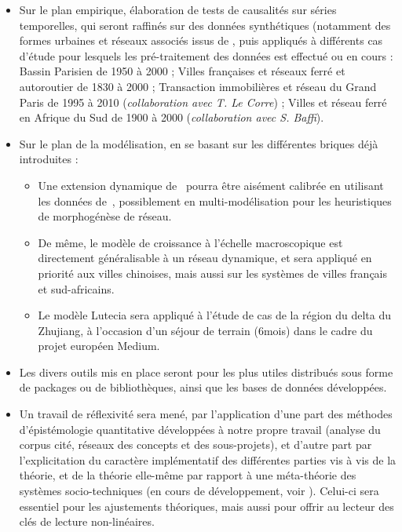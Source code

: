 \begin{itemize}
\item Sur le plan empirique, élaboration de tests de causalités sur séries temporelles, qui seront raffinés sur des données synthétiques (notamment des formes urbaines et réseaux associés issus de \cite{raimbault2014hybrid}, puis appliqués à différents cas d'étude pour lesquels les pré-traitement des données est effectué ou en cours : Bassin Parisien de 1950 à 2000 ; Villes françaises et réseaux ferré et autoroutier de 1830 à 2000 ; Transaction immobilières et réseau du Grand Paris de 1995 à 2010 (\textit{collaboration avec T. Le Corre}) ; Villes et réseau ferré en Afrique du Sud de 1900 à 2000 (\textit{collaboration avec S. Baffi}).
\item Sur le plan de la modélisation, en se basant sur les différentes briques déjà introduites :
\begin{itemize}
\item Une extension dynamique de~\cite{raimbault2016generation} pourra être aisément calibrée en utilisant les données de~\cite{raimbault2016cautious}, possiblement en multi-modélisation pour les heuristiques de morphogénèse de réseau.
\item De même, le modèle de croissance à l'échelle macroscopique est directement généralisable à un réseau dynamique, et sera appliqué en priorité aux villes chinoises, mais aussi sur les systèmes de villes français et sud-africains.
\item Le modèle Lutecia sera appliqué à l'étude de cas de la région du delta du Zhujiang, à l'occasion d'un séjour de terrain (6mois) dans le cadre du projet européen Medium.
\end{itemize}
\item Les divers outils mis en place seront pour les plus utiles distribués sous forme de packages ou de bibliothèques, ainsi que les bases de données développées.
\item Un travail de réflexivité sera mené, par l'application d'une part des méthodes d'épistémologie quantitative développées à notre propre travail (analyse du corpus cité, réseaux des concepts et des sous-projets), et d'autre part par l'explicitation du caractère implémentatif des différentes parties vis à vis de la théorie, et de la théorie elle-même par rapport à une méta-théorie des systèmes socio-techniques (en cours de développement, voir \cite{raimbault2016memoire}). Celui-ci sera essentiel pour les ajustements théoriques, mais aussi pour offrir au lecteur des clés de lecture non-linéaires.
\end{itemize}


